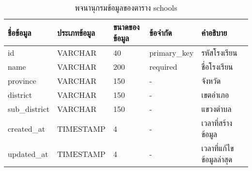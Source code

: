 \begin{table}[htbp]
    \caption{พจนานุกรมข้อมูลของตาราง schools}
    \label{tab:database-schools}
    \begin{tabularx}{\textwidth}{ | p{2.25cm} | p{2.20cm} | p{2.45cm} | p{2cm} | X | }
    \hline
    \textbf{ชื่อข้อมูล} & \textbf{ประเภทข้อมูล} & \textbf{ขนาดของข้อมูล} & \textbf{ข้อจำกัด} & \textbf{คำอธิบาย} \\
    \hline
    id & VARCHAR & 40 & primary\_key & รหัสโรงเรียน \\
    \hline
    name & VARCHAR & 200 & required & ชื่อโรงเรียน \\
    \hline
    province & VARCHAR & 150 & - & จังหวัด \\
    \hline
    district & VARCHAR & 150 & - & เขต\/อำเภอ \\
    \hline
    sub\_district & VARCHAR & 150 & - & แขวง\/ตำบล \\
    \hline
    created\_at & TIMESTAMP & 4 & - & เวลาที่สร้างข้อมูล \\
    \hline
    updated\_at & TIMESTAMP & 4 & - & เวลาที่แก้ไขข้อมูลล่าสุด \\
    \hline
    \end{tabularx}
\end{table}
